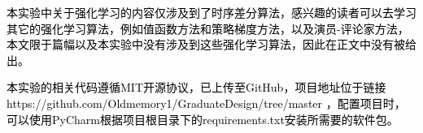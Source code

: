 
\begin{appendices}
\textcolor{black}{本实验中关于强化学习的内容仅涉及到了时序差分算法，感兴趣的读者可以去学习其它的强化学习算法，例如值函数方法和策略梯度方法，以及演员-评论家方法，本文限于篇幅以及本实验中没有涉及到这些强化学习算法，因此在正文中没有被给出。}

\textcolor{black}{本实验的相关代码遵循MIT开源协议，已上传至GitHub，项目地址位于链接}
\textcolor{black}{https://github.com/Oldmemory1/GraduateDesign/tree/master}
\textcolor{black}{，配置项目时，可以使用PyCharm根据项目根目录下的requirements.txt安装所需要的软件包。}
\end{appendices}
